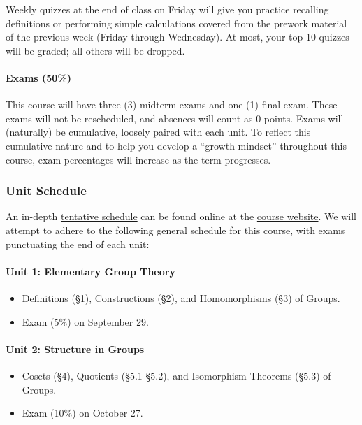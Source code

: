 \documentclass[
  twoside]{article}
\providecommand{\tightlist}{%
  \setlength{\itemsep}{0pt}\setlength{\parskip}{0pt}}
\begin{document}
Weekly quizzes at the end of class on Friday will give you practice
recalling definitions or performing simple calculations covered from the
prework material of the previous week (Friday through Wednesday). At
most, your top 10 quizzes will be graded; all others will be dropped.

\paragraph{Exams (50\%)}\label{exams-50}

This course will have three (3) midterm exams and one (1) final exam.
These exams will not be rescheduled, and absences will count as 0
points. Exams will (naturally) be cumulative, loosely paired with each
unit. To reflect this cumulative nature and to help you develop a
``growth mindset'' throughout this course, exam percentages will
increase as the term progresses.

\subsubsection{Unit Schedule}\label{unit-schedule}

An in-depth \href{../schedule.qmd}{tentative schedule} can be found
online at the \href{../index.qmd}{course website}. We will attempt to
adhere to the following general schedule for this course, with exams
punctuating the end of each unit:

\paragraph{Unit 1: Elementary Group
Theory}\label{unit-1-elementary-group-theory}

\begin{itemize}
\tightlist
\item
  Definitions (§1), Constructions (§2), and Homomorphisms (§3) of
  Groups.
\item
  Exam (5\%) on September 29.
\end{itemize}

\paragraph{Unit 2: Structure in
Groups}\label{unit-2-structure-in-groups}

\begin{itemize}
\tightlist
\item
  Cosets (§4), Quotients (§5.1-§5.2), and Isomorphism Theorems (§5.3) of
  Groups.
\item
  Exam (10\%) on October 27.
\end{itemize}
\end{document}
